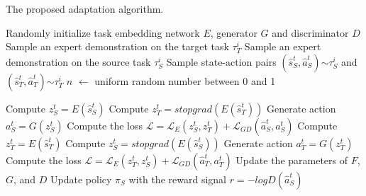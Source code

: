 \begin{algorithm}[H]
  \caption{The proposed adaptation algorithm.\label{ch:DTAIL:algo:TaskAdaptation}}
  \begin{algorithmic}[1]
    \Input
    \EndInput

    \State Randomly initialize task embedding network $E$, generator $G$ and discriminator $D$
    \State Sample an expert demonstration on the target task $\tau^i_T$
    \State Sample an expert demonstration on the source task $\tau^i_S$
    \State Sample state-action pairs $(\hat{s}^t_S, \hat{a}^t_S)$$\sim$$\tau^i_S$ and $(\hat{s}^t_T, \hat{a}^t_T)$$\sim$$\tau^i_T$
        \State $n$ $\leftarrow$ uniform random number between 0 and 1

        \State Compute $z^t_S = E(\hat{s}^t_S)$
        \State Compute $z^t_T = stopgrad(E(\hat{s}^t_T))$
        \State Generate action $a^t_S = G(z^t_S)$
        \State Compute the loss $\mathcal{L} = \mathcal{L}_E(z^t_S, z^t_T) + \mathcal{L}_{GD}(\hat{a}^t_S, a^t_S)$
        \Else
        \State Compute $z^t_T = E(\hat{s}^t_T)$
        \State Compute $z^t_S = stopgrad(E(\hat{s}^t_S))$
        \State Generate action $a^t_T = G(z^t_T)$
        \State Compute the loss $\mathcal{L} = \mathcal{L}_E(z^t_T, z^t_S) + \mathcal{L}_{GD}(\hat{a}^t_T, a^t_T)$
        \EndIf
        \State Update the parameters of $F$, $G$, and $D$
        \State Update policy $\pi_{S}$ with the reward signal $r=-logD(\hat{a}^t_S)$
    \EndFor

    \Output
    \EndOutput
  \end{algorithmic}
\end{algorithm}
